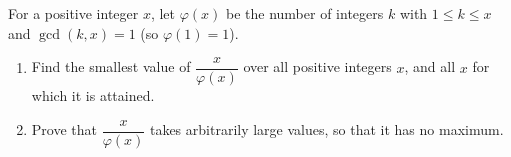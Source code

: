 For a positive integer $x$, let $\varphi(x)$ be the number of integers $k$ with $1\le k\le x$ and $\gcd(k,x)=1$ (so $\varphi(1)=1$).
\begin{enumerate}
\item[(a)] Find the smallest value of $\dfrac{x}{\varphi(x)}$ over all positive integers $x$, and all $x$ for which it is attained.
\item[(b)] Prove that $\dfrac{x}{\varphi(x)}$ takes arbitrarily large values, so that it has no maximum.
\end{enumerate}
